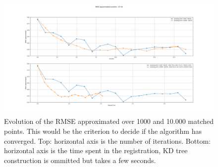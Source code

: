 \documentclass[a4paper]{article}
\begin{document}
\begin{figure}[H]
  \centering
  \includegraphics[width=1.\linewidth]{figures/RMS_APPROX_random_sampling_limit_1k_vs_10k.png}
  \caption{Evolution of the RMSE approximated over 1000 and  10.000 matched points. This would be the criterion to decide if the algorithm has converged. Top: horizontal axis is the number of iterations. Bottom: horizontal axis is the time spent in the registration, KD tree construction is ommitted but takes a few seconds.}
  \label{fig:real_scene_icp}
\end{figure}
\end{document}
